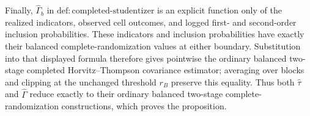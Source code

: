 Finally, \(\widehat\Gamma_b\) in \(\mathrm{def:completed\mbox{-}studentizer}\) is an explicit function only of the realized indicators, observed cell outcomes, and logged first- and second-order inclusion probabilities.  These indicators and inclusion probabilities have exactly their balanced complete-randomization values at either boundary.  Substitution into that displayed formula therefore gives pointwise the ordinary balanced two-stage completed Horvitz--Thompson covariance estimator; averaging over blocks and clipping at the unchanged threshold \(r_B\) preserve this equality.  Thus both \(\widehat\tau\) and \(\widehat\Gamma\) reduce exactly to their ordinary balanced two-stage complete-randomization constructions, which proves the proposition.
